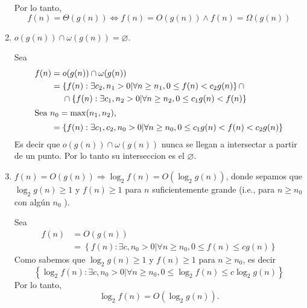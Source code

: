 \begin{problema}
\begin{enumerate}
\begin{dem}
\begin{itemize}
            \end{itemize}
            Por lo tanto, 
            $$f(n)=\Theta(g(n)) \Leftrightarrow f(n)=O(g(n)) \wedge f(n)=\Omega(g(n))$$
        \end{dem}
        \item $o(g(n)) \cap \omega(g(n))=\varnothing$.
        \begin{dem}
            Sea 
            \begin{align*}
                f(n) &= o(g(n)) \cap \omega(g(n))\\
                  &= \left\{f(n):\exists c_2,n_1>0|\forall n\geq n_1,0\leq f(n)< c_2g(n)\right\} \cap\\
                 &\ \ \ \  \cap\left\{f(n):\exists c_1,n_2>0|\forall n\geq n_2,0\leq c_1g(n)< f(n)\right\}\\
                  \intertext{Sea $n_0=\max(n_1,n_2)$,}
                    &= \left\{f(n):\exists c_1,c_2,n_0>0|\forall n\geq n_0,0\leq c_1g(n)<f(n)< c_2g(n)\right\}\\
            \end{align*}
            Es decir que $o(g(n)) \cap \omega(g(n))$ nunca se llegan a intersectar a partir de un punto. Por lo tanto su interseccion es el $\varnothing$. 
        \end{dem}
        \item $f(n)=O(g(n)) \Rightarrow \log _2 f(n)=O\left(\log _2 g(n)\right)$, donde sepamos que $\log _2 g(n) \geq 1$ y  $f(n) \geq 1$ para $n$ suficientemente grande (i.e., para $n \geq n_0$ con algún $n_0$ ).
        \begin{sol}
            Sea 
            \begin{align*}
                f(n)&=O(g(n))\\
                &=  \left\{f(n):\exists c,n_0>0|\forall n\geq n_0,0\leq f(n)\leq cg(n)\right\}
            \end{align*}
            Como sabemos que $\log _2 g(n) \geq 1$ y  $f(n) \geq 1$ para $n\geq n_0$, es decir $$\left\{\log _2f(n):\exists c,n_0>0|\forall n\geq n_0,0\leq\log _2 f(n)\leq c\log _2g(n)\right\}$$
            Por lo tanto, 
            $$\log _2 f(n)=O\left(\log _2 g(n)\right).$$
        \end{sol}
    \end{enumerate}

\end{problema}






%
%

